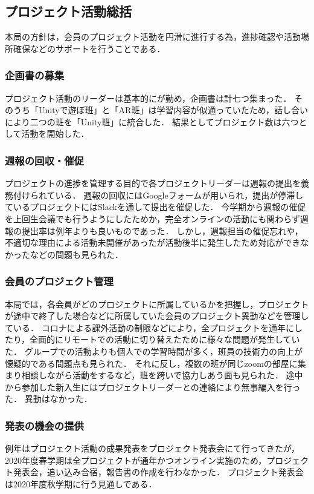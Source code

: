 \subsection*{プロジェクト活動総括}


本局の方針は，会員のプロジェクト活動を円滑に進行する為，進捗確認や活動場所確保などのサポートを行うことである．

\subsubsection*{企画書の募集}

プロジェクト活動のリーダーは基本的に\secondGrade{}が勤め，企画書は計七つ集まった．
そのうち「Unityで遊ぼ班」と「AR班」は学習内容が似通っていたため，話し合いにより二つの班を「Unity班」に統合した．
結果としてプロジェクト数は六つとして活動を開始した．

\subsubsection*{週報の回収・催促}

プロジェクトの進捗を管理する目的で各プロジェクトリーダーは週報の提出を義務付けられている．
週報の回収にはGoogleフォームが用いられ，提出が停滞しているプロジェクトにはSlackを通して提出を催促した．
今学期から週報の催促を上回生会議でも行うようにしたためか，完全オンラインの活動にも関わらず週報の提出率は例年よりも良いものであった．
しかし，週報担当の催促忘れや，不適切な理由による活動未開催があったが活動後半に発生したため対応ができなかったなどの問題も見られた．

\subsubsection*{会員のプロジェクト管理}

本局では，各会員がどのプロジェクトに所属しているかを把握し，プロジェクトが途中で終了した場合などに所属していた会員のプロジェクト異動などを管理している．
コロナによる課外活動の制限などにより，全プロジェクトを通年にしたり，全面的にリモートでの活動に切り替えたために様々な問題が発生していた．
グループでの活動よりも個人での学習時間が多く，班員の技術力の向上が懐疑的である問題点も見られた．
それに反し，複数の班が同じzoomの部屋に集まり相談しながら活動をするなど，班を跨いで協力しあう面も見られた．
途中から参加した新入生にはプロジェクトリーダーとの連絡により無事編入を行った．
異動はなかった．

\subsubsection*{発表の機会の提供}

例年はプロジェクト活動の成果発表をプロジェクト発表会にて行ってきたが，2020年度春学期は全プロジェクトが通年かつオンライン実施のため，プロジェクト発表会，追い込み合宿，報告書の作成を行わなかった．
プロジェクト発表会は2020年度秋学期に行う見通しである．
